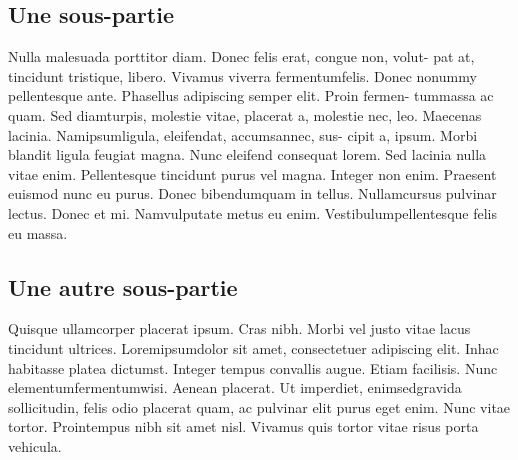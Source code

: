 \documentclass{article}
\begin{document}
\subsection{Une sous-partie}
Nulla malesuada porttitor diam. Donec felis erat, congue non, volut-
pat at, tincidunt tristique, libero. Vivamus viverra fermentumfelis. Donec
nonummy pellentesque ante. Phasellus adipiscing semper elit. Proin fermen-
tummassa ac quam. Sed diamturpis, molestie vitae, placerat a, molestie
nec, leo. Maecenas lacinia. Namipsumligula, eleifendat, accumsannec, sus-
cipit a, ipsum. Morbi blandit ligula feugiat magna. Nunc eleifend consequat
lorem. Sed lacinia nulla vitae enim. Pellentesque tincidunt purus vel magna.
Integer non enim. Praesent euismod nunc eu purus. Donec bibendumquam
in tellus. Nullamcursus pulvinar lectus. Donec et mi. Namvulputate metus
eu enim. Vestibulumpellentesque felis eu massa.

\subsection{Une autre sous-partie} %
Quisque ullamcorper placerat ipsum. Cras nibh. Morbi vel justo vitae
lacus tincidunt ultrices. Loremipsumdolor sit amet, consectetuer adipiscing
elit. Inhac habitasse platea dictumst. Integer tempus convallis augue. Etiam
facilisis. Nunc elementumfermentumwisi. Aenean placerat. Ut imperdiet,
enimsedgravida sollicitudin, felis odio placerat quam, ac pulvinar elit purus
eget enim. Nunc vitae tortor. Prointempus nibh sit amet nisl. Vivamus quis
tortor vitae risus porta vehicula.
\end{document}

